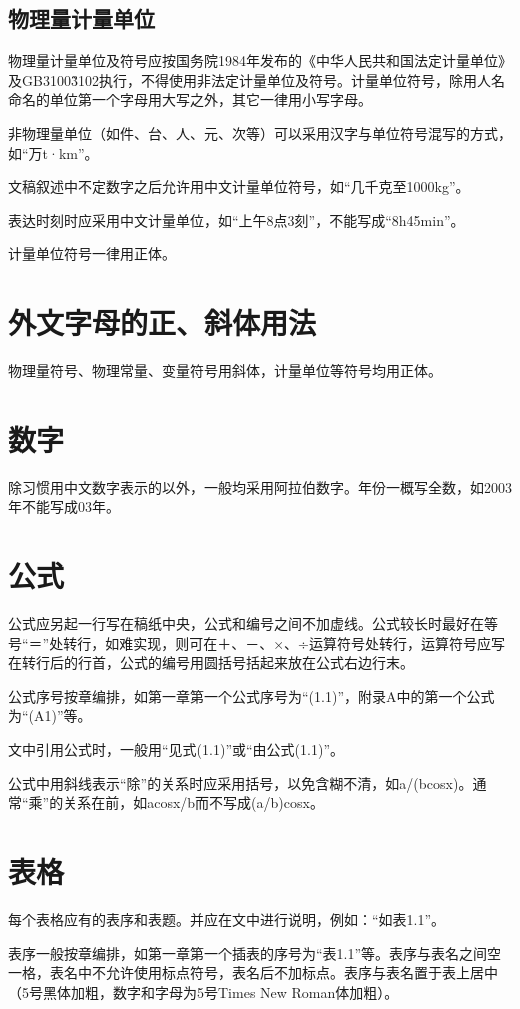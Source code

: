 \subsection{物理量计量单位}
物理量计量单位及符号应按国务院1984年发布的《中华人民共和国法定计量单位》及GB3100\~3102执行，不得使用非法定计量单位及符号。计量单位符号，除用人名命名的单位第一个字母用大写之外，其它一律用小写字母。

非物理量单位（如件、台、人、元、次等）可以采用汉字与单位符号混写的方式，如“万t·km”。

文稿叙述中不定数字之后允许用中文计量单位符号，如“几千克至1000kg”。

表达时刻时应采用中文计量单位，如“上午8点3刻”，不能写成“8h45min”。

计量单位符号一律用正体。

\section{外文字母的正、斜体用法}
物理量符号、物理常量、变量符号用斜体，计量单位等符号均用正体。

\section{数字}
除习惯用中文数字表示的以外，一般均采用阿拉伯数字。年份一概写全数，如2003年不能写成03年。

\section{公式}
公式应另起一行写在稿纸中央，公式和编号之间不加虚线。公式较长时最好在等号“＝”处转行，如难实现，则可在＋、－、×、÷运算符号处转行，运算符号应写在转行后的行首，公式的编号用圆括号括起来放在公式右边行末。

公式序号按章编排，如第一章第一个公式序号为“(1.1)”，附录A中的第一个公式为“(A1)”等。

文中引用公式时，一般用“见式(1.1)”或“由公式(1.1)”。

公式中用斜线表示“除”的关系时应采用括号，以免含糊不清，如a/(bcosx)。通常“乘”的关系在前，如acosx/b而不写成(a/b)cosx。

\section{表格}
每个表格应有的表序和表题。并应在文中进行说明，例如：“如表1.1”。

表序一般按章编排，如第一章第一个插表的序号为“表1.1”等。表序与表名之间空一格，表名中不允许使用标点符号，表名后不加标点。表序与表名置于表上居中（5号黑体加粗，数字和字母为5号Times New Roman体加粗）。

